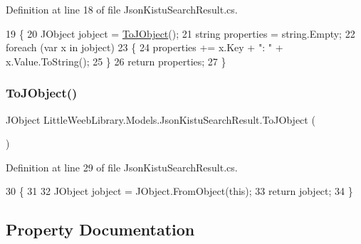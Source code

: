 Definition at line 18 of file Json\+Kistu\+Search\+Result.\+cs.


\begin{DoxyCode}
19         \{
20             JObject jobject = \mbox{\hyperlink{class_little_weeb_library_1_1_models_1_1_json_kistu_search_result_aa70ee158546f0b562318b143aca9d86f}{ToJObject}}();
21             \textcolor{keywordtype}{string} properties = \textcolor{keywordtype}{string}.Empty;
22             \textcolor{keywordflow}{foreach} (var x \textcolor{keywordflow}{in} jobject)
23             \{
24                 properties += x.Key + \textcolor{stringliteral}{": "} + x.Value.ToString();
25             \}
26             \textcolor{keywordflow}{return} properties;
27         \}
\end{DoxyCode}
\mbox{\label{class_little_weeb_library_1_1_models_1_1_json_kistu_search_result_aa70ee158546f0b562318b143aca9d86f}} 
\subsubsection{\texorpdfstring{To\+J\+Object()}{ToJObject()}}
{\footnotesize\ttfamily J\+Object Little\+Weeb\+Library.\+Models.\+Json\+Kistu\+Search\+Result.\+To\+J\+Object (\begin{DoxyParamCaption}{ }\end{DoxyParamCaption})}



Definition at line 29 of file Json\+Kistu\+Search\+Result.\+cs.


\begin{DoxyCode}
30         \{
31 
32             JObject jobject = JObject.FromObject(\textcolor{keyword}{this});
33             \textcolor{keywordflow}{return} jobject;
34         \}
\end{DoxyCode}


\subsection{Property Documentation}
\mbox{\label{class_little_weeb_library_1_1_models_1_1_json_kistu_search_result_a600c0af2c31a9ac1403e96a65ad97074}} 
